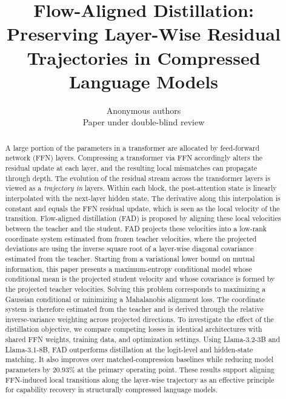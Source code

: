 \documentclass{article}
\title{Flow-Aligned Distillation: Preserving Layer-Wise Residual Trajectories in Compressed Language Models}
\author{Anonymous authors\\Paper under double-blind review}
\theoremstyle{plain}
\theoremstyle{definition}
\theoremstyle{remark}
\begin{document}
\maketitle

\begin{abstract}
A large portion of the parameters in a transformer are allocated by feed-forward network (FFN) layers. Compressing a transformer via FFN accordingly alters the residual update at each layer, and the resulting local mismatches can propagate through depth. The evolution of the residual stream across the transformer layers is viewed as a \emph{trajectory in} layers. Within each block, the post-attention state is linearly interpolated with the next-layer hidden state. The derivative along this interpolation is constant and equals the FFN residual update, which is seen as the local velocity of the transition. Flow-aligned distillation (FAD) is proposed by aligning these local velocities between the teacher and the student. FAD projects these velocities into a low-rank coordinate system estimated from frozen teacher velocities, where the projected deviations are using the inverse square root of a layer-wise diagonal covariance estimated from the teacher. Starting from a variational lower bound on mutual information, this paper presents a maximum-entropy conditional model whose conditional mean is the projected student velocity and whose covariance is formed by the projected teacher velocities. Solving this problem corresponds to maximizing a Gaussian conditional or minimizing a Mahalanobis alignment loss. The coordinate system is therefore estimated from the teacher and is derived through the relative inverse-variance weighting across projected directions. To investigate the effect of the distillation objective, we compare competing losses in identical architectures with shared FFN weights, training data, and optimization settings. Using Llama-3.2-3B and Llama-3.1-8B, FAD outperforms distillation at the logit-level and hidden-state matching. It also improves over matched-compression baselines while reducing model parameters by $20.93\%$ at the primary operating point. These results support aligning FFN-induced local transitions along the layer-wise trajectory as an effective principle for capability recovery in structurally compressed language models.
\end{abstract}
\end{document}
